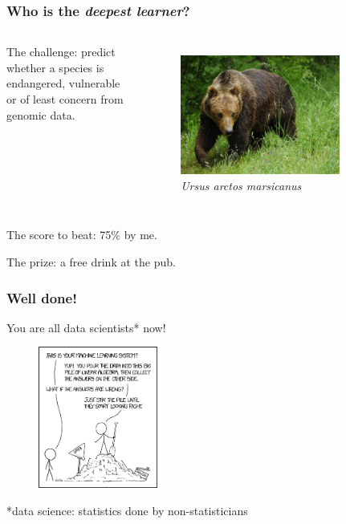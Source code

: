 \documentclass{beamer}
\begin{document}
\begin{frame}
        \frametitle{Who is the \textit{deepest learner}?}


        \begin{columns}
                The challenge: predict whether a species is endangered, vulnerable or of least
                concern from genomic data.
                \begin{figure}
                        \includegraphics[width=0.8\textwidth]{Pics/ursus.jpg} \\
                        \tiny{\textit{Ursus arctos marsicanus}}
                \end{figure}
        \end{columns}

        \vskip 1cm

        The score to beat: 75\% by me.

        The prize: a free drink at the pub.

\end{frame}


\begin{frame}
	\frametitle{Well done!}

	\vskip 0.2cm
	\small{You are all data scientists* now!}

	\begin{figure}
                \includegraphics[width=0.35\textwidth]{Pics/machine_learning.png}
        \end{figure}

	\vskip 0.5cm
	\centering
	\footnotesize{*data science: statistics done by non-statisticians}

\end{frame}
\end{document}
